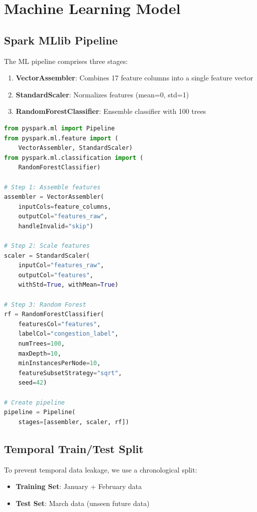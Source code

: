 \documentclass[conference]{IEEEtran}
\begin{document}
\section{Machine Learning Model}

\subsection{Spark MLlib Pipeline}

The ML pipeline comprises three stages:

\begin{enumerate}
    \item \textbf{VectorAssembler}: Combines 17 feature columns into a single feature vector
    \item \textbf{StandardScaler}: Normalizes features (mean=0, std=1)
    \item \textbf{RandomForestClassifier}: Ensemble classifier with 100 trees
\end{enumerate}

\begin{lstlisting}[caption={MLlib Pipeline Construction},language=Python]
from pyspark.ml import Pipeline
from pyspark.ml.feature import (
    VectorAssembler, StandardScaler)
from pyspark.ml.classification import (
    RandomForestClassifier)

# Step 1: Assemble features
assembler = VectorAssembler(
    inputCols=feature_columns,
    outputCol="features_raw",
    handleInvalid="skip")

# Step 2: Scale features
scaler = StandardScaler(
    inputCol="features_raw",
    outputCol="features",
    withStd=True, withMean=True)

# Step 3: Random Forest
rf = RandomForestClassifier(
    featuresCol="features",
    labelCol="congestion_label",
    numTrees=100,
    maxDepth=10,
    minInstancesPerNode=10,
    featureSubsetStrategy="sqrt",
    seed=42)

# Create pipeline
pipeline = Pipeline(
    stages=[assembler, scaler, rf])
\end{lstlisting}

\subsection{Temporal Train/Test Split}

To prevent temporal data leakage, we use a chronological split:

\begin{itemize}
    \item \textbf{Training Set}: January + February data
    \item \textbf{Test Set}: March data (unseen future data)
\end{itemize}
\end{document}
